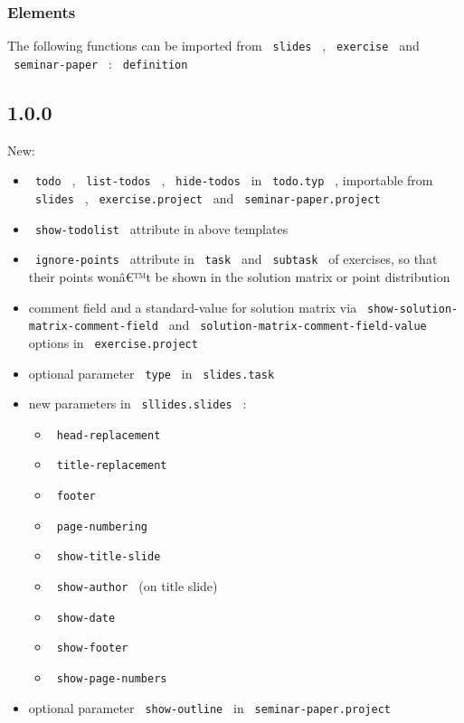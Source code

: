 \subsubsection{Elements}\label{elements}

The following functions can be imported from \texttt{\ slides\ } ,
\texttt{\ exercise\ } and \texttt{\ seminar-paper\ } :
\texttt{\ definition\ }

\subsection{1.0.0}\label{section}

New:

\begin{itemize}
\tightlist
\item
  \texttt{\ todo\ } , \texttt{\ list-todos\ } , \texttt{\ hide-todos\ }
  in \texttt{\ todo.typ\ } , importable from \texttt{\ slides\ } ,
  \texttt{\ exercise.project\ } and \texttt{\ seminar-paper.project\ }
\item
  \texttt{\ show-todolist\ } attribute in above templates
\item
  \texttt{\ ignore-points\ } attribute in \texttt{\ task\ } and
  \texttt{\ subtask\ } of exercises, so that their points wonâ€™t be
  shown in the solution matrix or point distribution
\item
  comment field and a standard-value for solution matrix via
  \texttt{\ show-solution-matrix-comment-field\ } and
  \texttt{\ solution-matrix-comment-field-value\ } options in
  \texttt{\ exercise.project\ }
\item
  optional parameter \texttt{\ type\ } in \texttt{\ slides.task\ }
\item
  new parameters in \texttt{\ sllides.slides\ } :

  \begin{itemize}
  \tightlist
  \item
    \texttt{\ head-replacement\ }
  \item
    \texttt{\ title-replacement\ }
  \item
    \texttt{\ footer\ }
  \item
    \texttt{\ page-numbering\ }
  \item
    \texttt{\ show-title-slide\ }
  \item
    \texttt{\ show-author\ } (on title slide)
  \item
    \texttt{\ show-date\ }
  \item
    \texttt{\ show-footer\ }
  \item
    \texttt{\ show-page-numbers\ }
  \end{itemize}
\item
  optional parameter \texttt{\ show-outline\ } in
  \texttt{\ seminar-paper.project\ }
\end{itemize}

